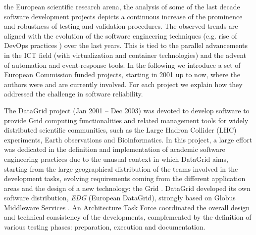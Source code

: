 \documentclass[journal]{IEEEtran}
\begin{document}
 the European scientific research arena, the analysis of some of the last decade software development projects depicts a continuous increase of the prominence and robustness of testing and validation procedures. The observed trends are aligned with the evolution of the software engineering techniques (e.g. rise of DevOps practices \cite{devops}) over the last years. This is tied to the parallel advancements in the ICT field (with virtualization and container technologies) and the advent of automation and event-response tools. In the following we introduce a set of European Commission funded projects, starting in 2001 up to now, where the authors were and are currently involved. For each project we explain how they addressed the challenge in software reliability.

The DataGrid \cite{cordis:datagrid} project (Jan 2001 -- Dec 2003) was devoted to develop software to provide Grid computing functionalities and related management tools for widely distributed scientific communities, such as the Large Hadron Collider (LHC) experiments, Earth observations and Bioinformatics. In this project, a large effort was dedicated in the definition and implementation of academic software engineering practices due to the unusual context in which DataGrid aims, starting from the large geographical distribution of the teams involved in the development tasks, evolving requirements coming from the different application areas and the design of a new technology: the Grid \cite{datagrid}. DataGrid developed its own software distribution, {\sl EDG} (European DataGrid), strongly based on Globus Middleware Services \cite{globus}. An Architecture Task Force coordinated the overall design and technical consistency of the developments, complemented by the definition of various testing phases: preparation, execution and documentation.
\end{document}
